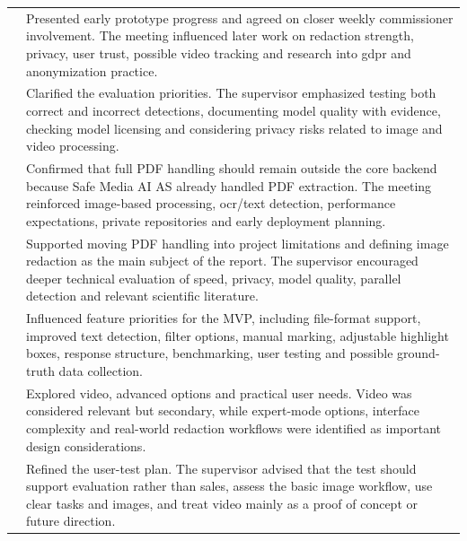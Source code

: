 \begin{xltabular}{\textwidth}{
    >{\raggedright\arraybackslash}p{2.7cm}
    >{\raggedright\arraybackslash}X
}
& Presented early prototype progress and agreed on closer weekly commissioner involvement. The meeting influenced later work on redaction strength, privacy, user trust, possible video tracking and research into \acrshort{gdpr} and \gls{anonymization} practice. \\

& Clarified the evaluation priorities. The supervisor emphasized testing both correct and incorrect detections, documenting model quality with evidence, checking model licensing and considering privacy risks related to image and video processing. \\

& Confirmed that full PDF handling should remain outside the core backend because Safe Media AI AS already handled PDF extraction. The meeting reinforced image-based processing, \acrshort{ocr}/text detection, performance expectations, private repositories and early deployment planning. \\

& Supported moving PDF handling into project limitations and defining image redaction as the main subject of the report. The supervisor encouraged deeper technical evaluation of speed, privacy, model quality, parallel detection and relevant scientific literature. \\

& Influenced feature priorities for the MVP, including file-format support, improved text detection, filter options, manual marking, adjustable highlight boxes, response structure, benchmarking, user testing and possible ground-truth data collection. \\

& Explored video, advanced options and practical user needs. Video was considered relevant but secondary, while expert-mode options, interface complexity and real-world redaction workflows were identified as important design considerations. \\

& Refined the user-test plan. The supervisor advised that the test should support evaluation rather than sales, assess the basic image workflow, use clear tasks and images, and treat video mainly as a proof of concept or future direction. \\


\end{xltabular}
